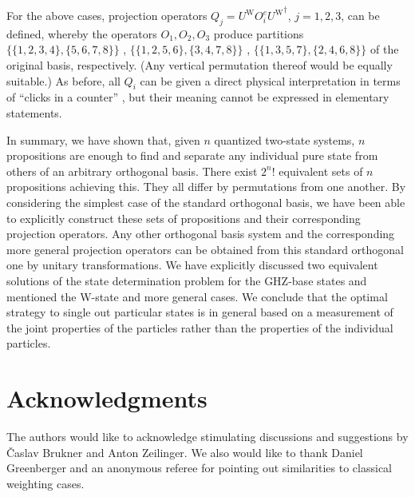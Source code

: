 %
For the above cases, projection operators $Q_j=U^{\textrm{W}}O_i^e{U^{\textrm{W}}}^\dagger$,
$j=1,2,3$, can be defined, whereby
the operators $O_1,O_2,O_3$ produce partitions
$\{
\{1 ,2 ,3 , 4 \},
\{5 ,6 ,7 , 8 \}
\}$
,
$\{
\{1 ,2 ,5 , 6 \},
\{3 ,4 ,7 , 8 \}
\}$
,
$\{
\{1 ,3 ,5 , 7 \},
\{2 ,4 ,6 , 8 \}
\}$ of the original basis, respectively.
(Any vertical permutation thereof would be equally suitable.)
As before, all $Q_i$ can be given a
direct physical interpretation in terms of ``clicks in a counter'' \cite{rzbb},
but their meaning cannot be expressed in elementary statements.



In summary, we have shown that, given $n$ quantized two-state systems,
 $n$ propositions are enough to
find and separate any
individual pure state
from others of an arbitrary orthogonal basis.
There exist $2^n!$ equivalent sets of $n$ propositions achieving this.
They all differ by permutations from one another.
By considering the simplest case of the standard orthogonal basis,
we have been able to explicitly construct these sets of propositions and their
corresponding projection operators.
Any other orthogonal basis system and the corresponding more general projection operators
can be obtained from this standard orthogonal one
by unitary transformations.
We have explicitly discussed two equivalent solutions
of the state determination problem for the GHZ-base states and mentioned
the W-state and more general cases.
We conclude that the optimal strategy to single out particular states is in general
based on a measurement of the joint properties of the particles rather than
the properties of the individual particles.

\section*{Acknowledgments}
The authors would like to acknowledge stimulating discussions and suggestions
by {\v{C}}aslav Brukner and Anton Zeilinger.
We also would like to thank Daniel Greenberger
and an anonymous referee for pointing out similarities to
classical weighting cases.



